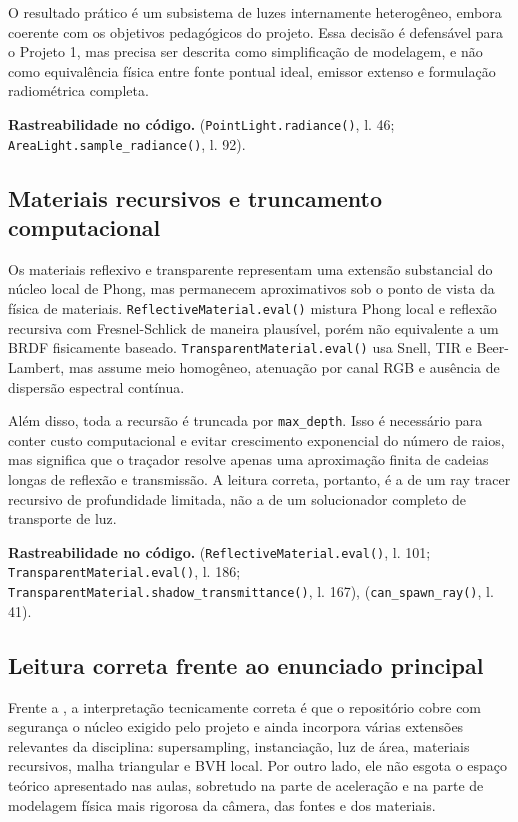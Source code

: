 \documentclass[portuguese]{sbcreviews-2025}%
\begin{document}
O resultado prático é um subsistema de luzes internamente heterogêneo, embora coerente com os objetivos pedagógicos do projeto. Essa decisão é defensável para o Projeto 1, mas precisa ser descrita como simplificação de modelagem, e não como equivalência física entre fonte pontual ideal, emissor extenso e formulação radiométrica completa.

\noindent\textbf{Rastreabilidade no código.}  (\texttt{PointLight.radiance()}, l. 46; \texttt{AreaLight.sample\_radiance()}, l. 92).

\subsection{Materiais recursivos e truncamento computacional}
\label{sec:limitacoes-materiais}

Os materiais reflexivo e transparente representam uma extensão substancial do núcleo local de Phong, mas permanecem aproximativos sob o ponto de vista da física de materiais. \texttt{ReflectiveMaterial.eval()} mistura Phong local e reflexão recursiva com Fresnel-Schlick de maneira plausível, porém não equivalente a um BRDF fisicamente baseado. \texttt{TransparentMaterial.eval()} usa Snell, TIR e Beer-Lambert, mas assume meio homogêneo, atenuação por canal RGB e ausência de dispersão espectral contínua.

Além disso, toda a recursão é truncada por \texttt{max\_depth}. Isso é necessário para conter custo computacional e evitar crescimento exponencial do número de raios, mas significa que o traçador resolve apenas uma aproximação finita de cadeias longas de reflexão e transmissão. A leitura correta, portanto, é a de um ray tracer recursivo de profundidade limitada, não a de um solucionador completo de transporte de luz.

\noindent\textbf{Rastreabilidade no código.}  (\texttt{ReflectiveMaterial.eval()}, l. 101; \texttt{TransparentMaterial.eval()}, l. 186; \texttt{TransparentMaterial.shadow\_transmittance()}, l. 167),  (\texttt{can\_spawn\_ray()}, l. 41).

\subsection{Leitura correta frente ao enunciado principal}
\label{sec:limitacoes-escopo}

Frente a , a interpretação tecnicamente correta é que o repositório cobre com segurança o núcleo exigido pelo projeto e ainda incorpora várias extensões relevantes da disciplina: supersampling, instanciação, luz de área, materiais recursivos, malha triangular e BVH local. Por outro lado, ele não esgota o espaço teórico apresentado nas aulas, sobretudo na parte de aceleração e na parte de modelagem física mais rigorosa da câmera, das fontes e dos materiais.
\end{document}

